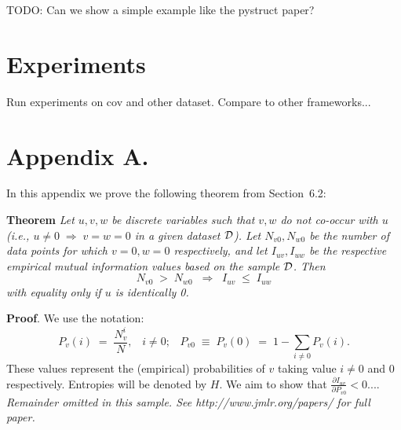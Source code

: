 \documentclass[twoside,11pt]{article}
\newcommand{\dataset}{{\cal D}}
\newcommand{\fracpartial}[2]{\frac{\partial #1}{\partial  #2}}
\newcommand{\0}{\mathbf{0}} %
\begin{document}
TODO: Can we show a simple example like the pystruct paper?

\section{Experiments}

Run experiments on cov and other dataset. Compare to other frameworks...




\newpage

\appendix
\section*{Appendix A.}
\label{app:theorem}



In this appendix we prove the following theorem from
Section~6.2:

\noindent
{\bf Theorem} {\it Let $u,v,w$ be discrete variables such that $v, w$ do
not co-occur with $u$ (i.e., $u\neq0\;\Rightarrow \;v=w=0$ in a given
dataset $\dataset$). Let $N_{v0},N_{w0}$ be the number of data points for
which $v=0, w=0$ respectively, and let $I_{uv},I_{uw}$ be the
respective empirical mutual information values based on the sample
$\dataset$. Then
\[
	N_{v0} \;>\; N_{w0}\;\;\Rightarrow\;\;I_{uv} \;\leq\;I_{uw}
\]
with equality only if $u$ is identically 0.} \hfill\BlackBox

\noindent
{\bf Proof}. We use the notation:
\[
P_v(i) \;=\;\frac{N_v^i}{N},\;\;\;i \neq 0;\;\;\;
P_{v0}\;\equiv\;P_v(0)\; = \;1 - \sum_{i\neq 0}P_v(i).
\]
These values represent the (empirical) probabilities of $v$
taking value $i\neq 0$ and 0 respectively.  Entropies will be denoted
by $H$. We aim to show that $\fracpartial{I_{uv}}{P_{v0}} < 0$....\\

{\noindent \em Remainder omitted in this sample. See http://www.jmlr.org/papers/ for full paper.}


\vskip 0.2in

\end{document}

